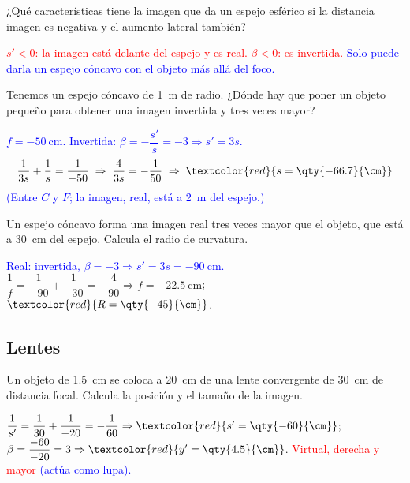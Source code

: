 \begin{exercise}
    ¿Qué características tiene la imagen que da un espejo esférico si la distancia imagen es negativa y el aumento lateral
    también?
    \begin{solu}
        \textcolor{red}{\(s' < 0\): la imagen está delante del espejo y es real. \(\beta < 0\): es invertida.}
        \textcolor{blue}{Solo puede darla un espejo cóncavo con el objeto más allá del foco.}
    \end{solu}
\end{exercise}

\begin{exercise}
    Tenemos un espejo cóncavo de \qty{1}{\m} de radio. ¿Dónde hay que poner un objeto pequeño para obtener una imagen
    invertida y tres veces mayor?
    \begin{solu}
        \textcolor{blue}{\(f = \qty{-50}{\cm}\). Invertida: \(\beta = -\dfrac{s'}{s} = -3 \Rightarrow s' = 3s\).}
        \[ \dfrac{1}{3s} + \dfrac{1}{s} = \dfrac{1}{-50} \;\Rightarrow\; \dfrac{4}{3s} = -\dfrac{1}{50} \;\Rightarrow\; \textcolor{red}{s = \qty{-66.7}{\cm}} \]
        \textcolor{blue}{(Entre \(C\) y \(F\); la imagen, real, está a \qty{2}{\m} del espejo.)}
    \end{solu}
\end{exercise}

\begin{exercise}
    Un espejo cóncavo forma una imagen real tres veces mayor que el objeto, que está a \qty{30}{\cm} del espejo. Calcula el
    radio de curvatura.
    \begin{solu}
        \textcolor{blue}{Real: invertida, \(\beta = -3 \Rightarrow s' = 3s = \qty{-90}{\cm}\).}
        \(\dfrac{1}{f} = \dfrac{1}{-90} + \dfrac{1}{-30} = -\dfrac{4}{90} \Rightarrow f = \qty{-22.5}{\cm}\);
        \(\textcolor{red}{R = \qty{-45}{\cm}}\).
    \end{solu}
\end{exercise}

\subsection{Lentes}

\begin{exercise}
    Un objeto de \qty{1.5}{\cm} se coloca a \qty{20}{\cm} de una lente convergente de \qty{30}{\cm} de distancia focal.
    Calcula la posición y el tamaño de la imagen.
    \begin{solu}
        \(\dfrac{1}{s'} = \dfrac{1}{30} + \dfrac{1}{-20} = -\dfrac{1}{60} \Rightarrow \textcolor{red}{s' = \qty{-60}{\cm}}\);
        \(\beta = \dfrac{-60}{-20} = 3 \Rightarrow \textcolor{red}{y' = \qty{4.5}{\cm}}\).
        \textcolor{red}{Virtual, derecha y mayor} \textcolor{blue}{(actúa como lupa).}
    \end{solu}
\end{exercise}

